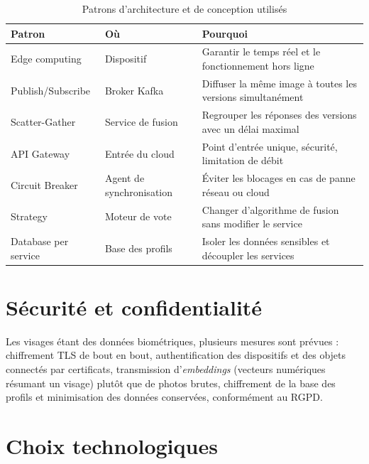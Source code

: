 \documentclass[11pt,a4paper]{report}
\begin{document}
\begin{table}[H]
\centering
\caption{Patrons d'architecture et de conception utilisés}
\label{tab:patrons}
\begin{tabularx}{\textwidth}{>{\raggedright\arraybackslash}p{3.4cm} >{\raggedright\arraybackslash}p{3.6cm} L}
\toprule
{}\textbf{Patron} & \textbf{Où} & \textbf{Pourquoi}\\
\midrule
Edge computing & Dispositif & Garantir le temps réel et le fonctionnement hors ligne\\
Publish/Subscribe & Broker Kafka & Diffuser la même image à toutes les versions simultanément\\
Scatter-Gather & Service de fusion & Regrouper les réponses des versions avec un délai maximal\\
API Gateway & Entrée du cloud & Point d'entrée unique, sécurité, limitation de débit\\
Circuit Breaker & Agent de synchronisation & Éviter les blocages en cas de panne réseau ou cloud\\
Strategy & Moteur de vote & Changer d'algorithme de fusion sans modifier le service\\
Database per service & Base des profils & Isoler les données sensibles et découpler les services\\
\bottomrule
\end{tabularx}
\end{table}

\section{Sécurité et confidentialité}

Les visages étant des données biométriques, plusieurs mesures sont prévues : chiffrement TLS de bout en bout, authentification des dispositifs et des objets connectés par certificats, transmission d'\emph{embeddings} (vecteurs numériques résumant un visage) plutôt que de photos brutes, chiffrement de la base des profils et minimisation des données conservées, conformément au RGPD.

\section{Choix technologiques}
\end{document}

